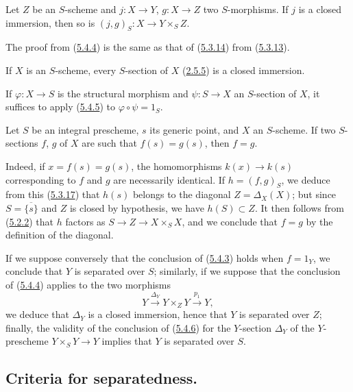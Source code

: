\begin{corollary}[5.4.5]
\label{I.5.4.5}
Let $Z$ be an $S$-scheme and $j:X\to Y$, $g:X\to Z$ two $S$-morphisms. If $j$
is a closed immersion, then so is
$(j,g)_S:X\to Y\times_S Z$.
\end{corollary}

The proof from (\hyperref[I.5.4.4]{5.4.4}) is the same as
that of (\hyperref[I.5.3.14]{5.3.14}) from
(\hyperref[I.5.3.13]{5.3.13}).

\begin{corollary}[5.4.6]
\label{I.5.4.6}
If $X$ is an $S$-scheme, every $S$-section of $X$
(\hyperref[I.2.5.5]{2.5.5}) is a closed immersion.
\end{corollary}

If $\varphi:X\to S$ is the structural morphism and $\psi:S\to X$ an
$S$-section of $X$, it suffices to apply
(\hyperref[I.5.4.5]{5.4.5}) to $\varphi\circ\psi=1_S$.

\begin{corollary}[5.4.7]
\label{I.5.4.7}
Let $S$ be an integral prescheme, $s$ its generic point, and $X$ an
$S$-scheme. If two $S$-sections $f$, $g$ of $X$ are such that $f(s)=g(s)$,
then $f=g$.
\end{corollary}

Indeed, if $x=f(s)=g(s)$, the homomorphisms $k(x)\to k(s)$ corresponding to
$f$ and $g$ are necessarily identical. If $h=(f,g)_S$, we deduce from this
(\hyperref[I.5.3.17]{5.3.17}) that $h(s)$ belongs to the diagonal
$Z=\Delta_X(X)$; but since $S=\overline{\{s\}}$ and $Z$ is closed by
hypothesis, we have $h(S)\subset Z$. It then follows from
(\hyperref[I.5.2.2]{5.2.2}) that $h$ factors as
$S\to Z\to X\times_S X$, and we conclude that $f=g$ by the definition of the
diagonal.

\begin{remark}[5.4.8]
\label{I.5.4.8}
If we suppose conversely that the conclusion of
(\hyperref[I.5.4.3]{5.4.3}) holds when $f=1_Y$, we conclude
that $Y$ is separated over $S$; similarly, if we suppose that the conclusion
of (\hyperref[I.5.4.4]{5.4.4}) applies to the two morphisms
\[
  Y\xrightarrow{\Delta_Y}Y\times_Z Y\xrightarrow{p_1}Y,
\]
we deduce that $\Delta_Y$ is a closed immersion, hence that $Y$ is separated
over $Z$; finally, the validity of the conclusion of
(\hyperref[I.5.4.6]{5.4.6}) for the $Y$-section $\Delta_Y$ of the
$Y$-prescheme $Y\times_S Y\to Y$ implies that $Y$ is separated over
$S$.
\end{remark}


\subsection{Criteria for separatedness.}
\label{subsection:I.5.5}

